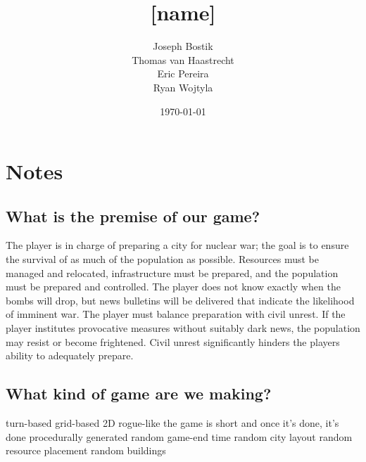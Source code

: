 \documentclass{article}
\begin{document}

\begin{titlepage}

  \title{[name]}
  \date{\today}
  \author{Joseph Bostik\\
    Thomas van Haastrecht\\
    Eric Pereira\\
    Ryan Wojtyla\\}

  \maketitle

\end{titlepage}



\section{Notes}

\subsection{What is the premise of our game?}

\begin{outline}[enumerate]
  \1 The player is in charge of preparing a city for nuclear war; the goal is to
  ensure the survival of as much of the population as possible.
  \1 Resources must be managed and relocated, infrastructure must be prepared,
  and the population must be prepared and controlled.
  \1 The player does not know exactly when the bombs will drop, but news
  bulletins will be delivered that indicate the likelihood of imminent war.
  \1 The player must balance preparation with civil unrest.
    \2 If the player institutes provocative measures without suitably
    dark news, the population may resist or become frightened.
    \2 Civil unrest significantly hinders the players ability to adequately prepare.
\end{outline}

\subsection{What kind of game are we making?}

\begin{outline}[enumerate]
  \1 turn-based
  \1 grid-based
    \2 2D
  \1 rogue-like
    \2 the game is short and once it's done, it's done
  \1 procedurally generated 
    \2 random game-end time
    \2 random city layout
      \3 random resource placement
      \3 random buildings
\end{outline}
\end{document}
